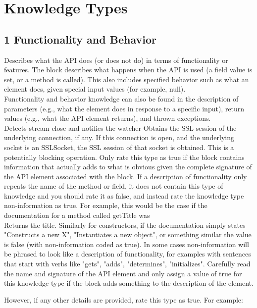 \section*{Knowledge Types}

\subsection*{1 Functionality and Behavior}
Describes what the API does (or does not do) in terms of functionality or features. The block describes what happens when the API is used (a field value is set, or a method is called). This also includes specified behavior such as what an element does, given special input values (for example, null). \\

Functionality and behavior knowledge can also be found in the description of parameters (e.g., what the element does in response to a specific input), return values (e.g., what the API element returns), and thrown exceptions.
\\
Detects stream close and notifies the watcher
Obtains the SSL session of the underlying connection, if any. If this connection is open, and the underlying socket is an SSLSocket, the SSL session of that socket is obtained. This is a potentially blocking operation.
Only rate this type as true if the block contains information that actually adds to what is obvious given the complete signature of the API element associated with the block. If a description of functionality only repeats the name of the method or field, it does not contain this type of knowledge and you should rate it as false, and instead rate the knowledge type non-information as true. For example, this would be the case if the documentation for a method called getTitle was
\\
Returns the title.
Similarly for constructors, if the documentation simply states "Constructs a new X", "Instantiates a new object", or something similar the value is false (with non-information coded as true). In some cases non-information will be phrased to look like a description of functionality, for examples with sentences that start with verbs like "gets", "adds", "determines", "initializes". Carefully read the name and signature of the API element and only assign a value of true for this knowledge type if the block adds something to the description of the element.

However, if any other details are provided, rate this type as true. For example:

